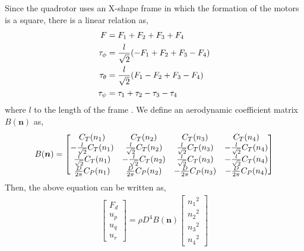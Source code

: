 Since the quadrotor uses an X-shape frame in which the formation of the motors is a square, there is a linear relation as, \\
\begin{equation}
\begin{aligned}
F & = F_1 + F_2 + F_3 + F_4 \\
\tau_{\phi} & = {l \over {\sqrt{2}}} ( - F_1 + F_2 + F_3 - F_4)\\
\tau_{\theta} & = { l \over {\sqrt{2}}} (  F_1 - F_2 + F_3 - F_4)\\
\tau_{\psi} & =  \tau_1 + \tau_2 - \tau_3 - \tau_4
\end{aligned}
\end{equation}
where \(l\) to the length of the frame \cite{randal08}. We define an aerodynamic coefficient matrix \(B ({\boldsymbol n})\) as,
\begin{equation}
\begin{aligned}
B ({\boldsymbol n}) = 
\begin{bmatrix}
C_T (n_1)	& C_T (n_2)	& C_T (n_3)	& C_T (n_4)\\
- {l \over{\sqrt{2}}} C_T (n_1)		& {l \over{\sqrt{2}}} C_T (n_2)		& {l \over{\sqrt{2}}} C_T (n_3)	& - {l \over{\sqrt{2}}} C_T (n_4) \\
{l \over{\sqrt{2}}} C_T (n_1)		& - {l \over{\sqrt{2}}} C_T (n_2)		& {l \over{\sqrt{2}}} C_T (n_3)	& - {l \over{\sqrt{2}}} C_T (n_4) \\
{D \over{2\pi}} C_P (n_1)			& {D \over{2\pi}} C_P	 (n_2)		& - {D \over{2\pi}} C_P (n_3)	& - {D \over{2\pi}} C_P (n_4)
\end{bmatrix}
\end{aligned}
\end{equation}
Then, the above equation can be written as,\\
\begin{equation}
\label{eq:u_n}
\begin{aligned}
\begin{bmatrix}
F_d\\
u_p\\
u_q\\
u_r
\end{bmatrix}
= \rho D^4 B ({\boldsymbol n})
\begin{bmatrix}
{n_1}^2 \\
{n_2}^2 \\
{n_3}^2 \\
{n_4}^2
\end{bmatrix}
\end{aligned}
\end{equation}
